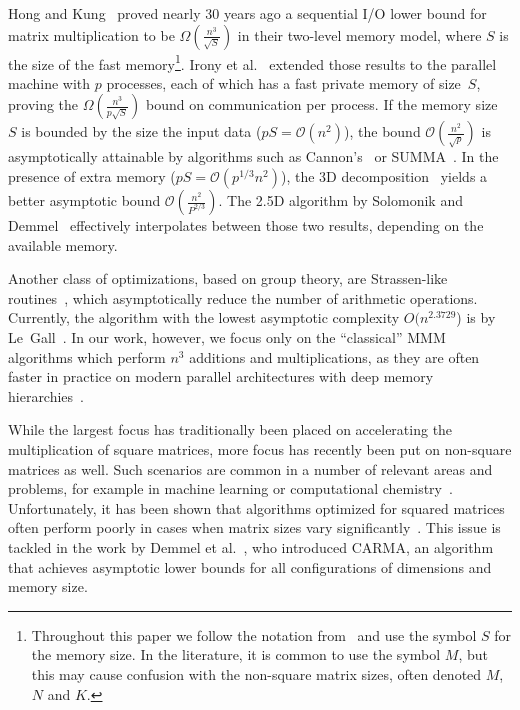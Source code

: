 \documentclass[sigplan,review,anonymous]{acmart}\settopmatter{printfolios=true,printccs=false,printacmref=false}
\newcommand\mac[1]{\textcolor{red}{[Mac: #1]}}
\begin{document}
Hong and Kung~\cite{redblue} proved nearly 30 years ago a sequential I/O lower
bound for matrix multiplication to be $\Omega\left(\frac{n^3}{\sqrt{S}}\right)$
in their two-level memory model, where $S$
is the size of the fast memory\footnote{Throughout this paper we
	follow the notation from~\cite{redblue} and use the symbol $S$ for the 
	memory
	size. In the literature, it is common to use the symbol $M$, but this may 
	cause
	confusion with the non-square matrix sizes, often denoted $M$, $N$ and
	$K$.}. 
	Irony et al.~\cite{IronyMMM} extended those
results to the parallel machine with $p$ processes,
each of which has a fast private memory of size~$S$, proving the
$\Omega\left(\frac{n^3}{p\sqrt{S}}\right)$ bound on communication per process.
%
%
If the memory size~$S$ is bounded by the size the
input data ($pS = \mathcal{O}(n^2)$), the bound
$\mathcal{O}\left(\frac{n^2}{\sqrt{p}}\right)$  is asymptotically attainable by
algorithms such as Cannon's~\cite{Cannon} or SUMMA~\cite{summa}. In the
presence of extra memory ($pS = \mathcal{O}(p^{1/3} n^2)$), the 3D
decomposition~\cite{summa3d} yields a better asymptotic bound
$\mathcal{O}\left(\frac{n^2}{P^{2/3}}\right)$. The 2.5D algorithm by Solomonik
and Demmel~\cite{25d} effectively interpolates
between those two results, depending on the available
memory.

Another class of optimizations, based on group theory,
are Strassen-like routines~\cite{Strassen}, which asymptotically reduce the
number of arithmetic operations. Currently, the algorithm with the lowest
asymptotic complexity $O(n^{2.3729}$) is by Le~Gall~\cite{LeGall}. In our work,
however, we focus only on the ``classical'' MMM algorithms which perform $n^3$
additions and multiplications, as they are often faster in practice on modern 
parallel architectures with deep memory hierarchies~\cite{strassenVsClassic}.  

While the largest focus has traditionally been
placed on accelerating the multiplication of square matrices, more focus has
recently been put on
non-square matrices as well. Such scenarios are common in a number of
relevant areas and problems, for example in machine learning
\cite{rectangularML} or computational chemistry~\cite{rectangularChemistry}.
%
Unfortunately, it has been shown
that algorithms optimized for squared matrices often perform poorly in cases
when matrix sizes vary significantly~\cite{CARMA}. 
%
This issue is tackled in the work by Demmel et al.~\cite{CARMA}, who introduced
CARMA, an algorithm that achieves asymptotic lower bounds for all
configurations of dimensions and memory size.  
\end{document}
